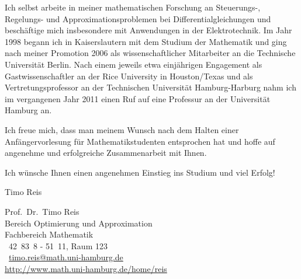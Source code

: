 \clearpage

Ich selbst arbeite in meiner mathematischen Forschung an Steuerungs-,\linebreak
Regelungs- und Approximationsproblemen bei Differentialgleichungen und
besch\"aftige mich insbesondere mit Anwendungen in der Elektrotechnik. Im Jahr
1998 begann ich in Kaiserslautern mit dem Studium der Mathematik und ging nach
meiner Promotion 2006 als wissenschaftlicher Mitarbeiter an die Technische
Universit\"at Berlin. Nach einem jeweils etwa einj\"ahrigen Engagement als
Gastwissenschaftler an der Rice University in Houston/Texas und als
Vertretungsprofessor an der Technischen Universit\"at Hamburg-Harburg nahm ich
im vergangenen Jahr 2011 einen Ruf auf eine Professur an der Universit\"at
Hamburg an.

Ich freue mich, dass man meinem Wunsch nach dem Halten einer
Anf\"angervorlesung f\"ur Mathematikstudenten entsprochen hat und hoffe auf
angenehme und erfolgreiche Zusammenarbeit mit Ihnen.

Ich w\"unsche Ihnen einen angenehmen Einstieg ins Studium und viel Erfolg!

\bigskip

\hfill Timo Reis

Prof.~Dr.~Timo Reis\\
Bereich Optimierung und Approximation\\
Fachbereich Mathematik\\
\Telefon\ 42~83~8 - 51~11, Raum 123\\
\Letter\ \href{mailto:timo.reis@math.uni-hamburg.de}{timo.reis@math.uni-hamburg.de}\\
\url{http://www.math.uni-hamburg.de/home/reis}

